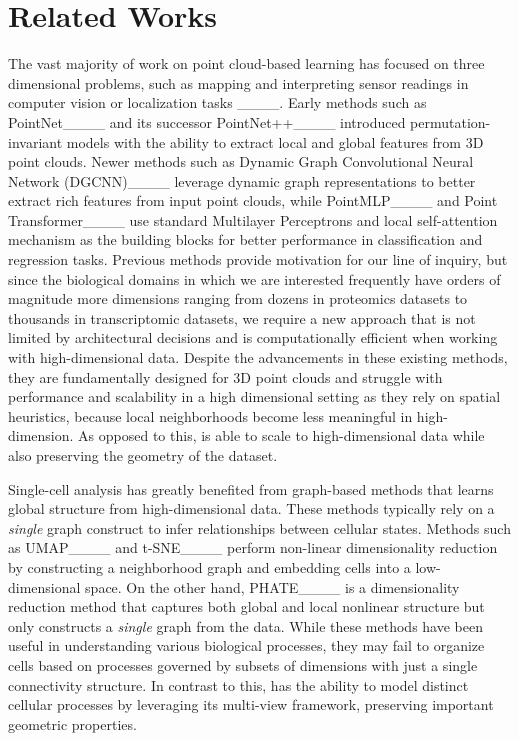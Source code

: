 \section{Related Works}
\label{sec:related}
The vast majority of work on point cloud-based learning has focused on three dimensional problems, such as mapping and interpreting sensor readings in computer vision or localization tasks ____. Early methods such as PointNet____ and its successor PointNet++____ introduced permutation-invariant models with the ability to extract local and global features from 3D point clouds. Newer methods such as Dynamic Graph Convolutional Neural Network (DGCNN)____ leverage dynamic graph representations to better extract rich features from input point clouds, while PointMLP____ and Point Transformer____ use standard Multilayer Perceptrons and local self-attention mechanism as the building blocks for better performance in classification and regression tasks. Previous methods provide motivation for our line of inquiry, but since the biological domains in which we are interested frequently have orders of magnitude more dimensions ranging from dozens in proteomics datasets to thousands in transcriptomic datasets, we require a new approach that is not limited by architectural decisions and is computationally efficient when working with high-dimensional data. Despite the advancements in these existing methods, they are fundamentally designed for 3D point clouds and struggle with performance and scalability in a high dimensional setting as they rely on spatial heuristics, because local neighborhoods become less meaningful in high-dimension. As opposed to this, {\modelname} is able to scale to high-dimensional data while also preserving the geometry of the dataset.

Single-cell analysis has greatly benefited from graph-based methods that learns global structure from high-dimensional data. These methods typically rely on a \emph{single} graph construct to infer relationships between cellular states. Methods such as UMAP____ and t-SNE____ perform non-linear dimensionality reduction by constructing a neighborhood graph and embedding cells into a low-dimensional space. On the other hand, PHATE____ is a dimensionality reduction method that captures both global and local nonlinear structure but only constructs a \emph{single} graph from the data. While these methods have been useful in understanding various biological processes, they may fail to organize cells based on processes governed by subsets of dimensions with just a single connectivity structure. In contrast to this, {\modelname} has the ability to model distinct cellular processes by leveraging its multi-view framework, preserving important geometric properties.